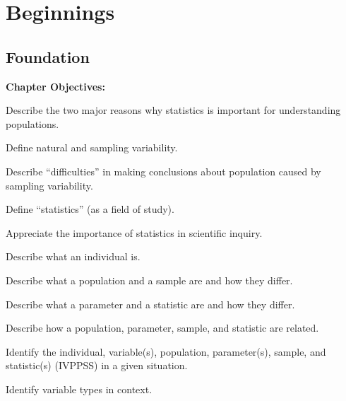 \documentclass[10pt,openany]{book}\usepackage[]{graphicx}\usepackage[]{color}
\begin{document}
  \frontmatter
    

  \mainmatter
    \part{Beginnings}



\chapter{Foundation} \label{chap:Foundations}
\begin{ChapObj}{\boxwidth}
  \textbf{Chapter Objectives:}
  \begin{Enumerate}
    \item Describe the two major reasons why statistics is important for understanding populations.
    \item Define natural and sampling variability.
    \item Describe ``difficulties'' in making conclusions about population caused by sampling variability.
    \item Define ``statistics'' (as a field of study).
    \item Appreciate the importance of statistics in scientific inquiry.
    \item Describe what an individual is.
    \item Describe what a population and a sample are and how they differ.
    \item Describe what a parameter and a statistic are and how they differ.
    \item Describe how a population, parameter, sample, and statistic are related.
    \item Identify the individual, variable(s), population, parameter(s), sample, and statistic(s) (IVPPSS) in a given situation.
    \item Identify variable types in context.
  \end{Enumerate}
\end{ChapObj}

\minitoc
\newpage
\end{document}
